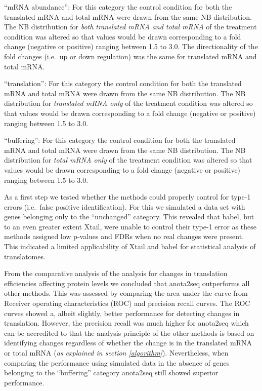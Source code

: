 \documentclass[12pt,openany]{book}
\begin{document}
``mRNA abundance'': For this category the control condition for both the
translated mRNA and total mRNA were drawn from the same NB distribution.
The NB distribution for \emph{both translated mRNA and total mRNA} of
the treatment condition was altered so that values would be drawn
corresponding to a fold change (negative or positive) ranging between
1.5 to 3.0. The directionality of the fold changes (i.e.~up or down
regulation) was the same for translated mRNA and total mRNA.

``translation'': For this category the control condition for both the
translated mRNA and total mRNA were drawn from the same NB distribution.
The NB distribution for \emph{translated mRNA only} of the treatment
condition was altered so that values would be drawn corresponding to a
fold change (negative or positive) ranging between 1.5 to 3.0.

``buffering'': For this category the control condition for both the
translated mRNA and total mRNA were drawn from the same NB distribution.
The NB distribution for \emph{total mRNA only} of the treatment
condition was altered so that values would be drawn corresponding to a
fold change (negative or positive) ranging between 1.5 to 3.0.

As a first step we tested whether the methods could properly control for
type-1 errors (i.e.~false positive identification). For this we
simulated a data set with genes belonging only to the ``unchanged''
category. This revealed that babel, but to an even greater extent Xtail,
were unable to control their type-1 error as these methods assigned low
p-values and FDRs when no real changes were present. This indicated a
limited applicability of Xtail and babel for statistical analysis of
translatomes.

From the comparative analysis of the analysis for changes in translation
efficiencies affecting protein levels we concluded that anota2seq
outperforms all other methods. This was assessed by comparing the area
under the curve from Receiver operating characteristics (ROC) and
precision recall curves. The ROC curves showed a, albeit slightly,
better performance for detecting changes in translation. However, the
precision recall was much higher for anota2seq which can be accredited
to that the analysis principle of the other methods is based on
identifying changes regardless of whether the change is in the
translated mRNA or total mRNA (\emph{as explained in section
\ref{algorithm}}). Nevertheless, when comparing the performance using
simulated data in the absence of genes belonging to the ``buffering''
category anota2seq still showed superior performance.
\end{document}
